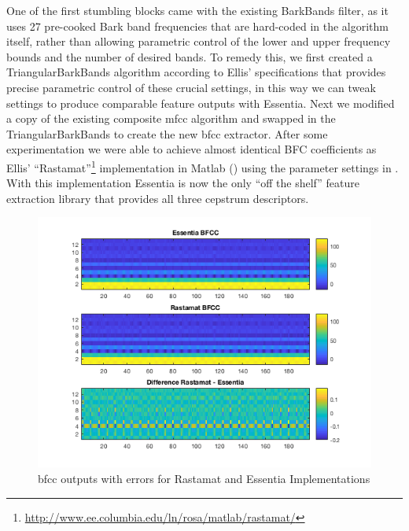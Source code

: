 {{{{One of the first stumbling blocks came with the existing BarkBands filter, as it uses 27 pre-cooked Bark band frequencies that are hard-coded in the algorithm itself, rather than allowing parametric control of the lower and upper frequency bounds and the number of desired bands. To remedy this, we first created a TriangularBarkBands algorithm according to Ellis' specifications that provides precise parametric control of these crucial settings, in this way we can tweak settings to produce comparable feature outputs with Essentia. Next we modified a copy of the existing composite \acrshort{mfcc} algorithm and swapped in the TriangularBarkBands to create the new \acrshort{bfcc} extractor. After some experimentation we were able to achieve almost identical BFC coefficients as Ellis' ``Rastamat''\footnote{\url{http://www.ee.columbia.edu/ln/rosa/matlab/rastamat/}} implementation in Matlab () using the parameter settings in . With this implementation Essentia is now the only ``off the shelf'' feature extraction library that provides all three cepstrum descriptors.

\begin{figure}
	\begin{center}
		\includegraphics[width=1.0\textwidth]{ch05_pyconcat/figures/matlab_bark.png}
	\end{center}
	\caption[BFCC outputs with errors for Rastamat and Essentia Implementations]{\acrshort{bfcc} outputs with errors for Rastamat and Essentia Implementations}
	\label{fig:matlab_bark}
\end{figure}

}}}}
